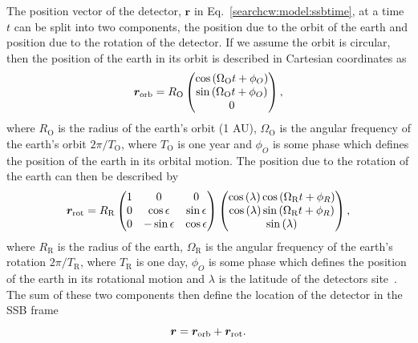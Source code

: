 The position vector of the detector,
$\bm{r}$ in Eq.~\ref{searchcw:model:ssbtime}, at a time $t$ can be split into two components,
the position due to the orbit of the earth and position due to the rotation of
the detector.
If we assume the orbit is circular, then the position of the earth in its orbit
is described in Cartesian coordinates as
%
\begin{equation}
    \bm{r}_{\rm{orb}} = R_{\mathrm{O}}
    \left(
    \begin{matrix}
        \cos{\left( \Omega_{\mathrm{O}} t + \phi_{O}  \right)}  \\
        \sin{\left( \Omega_{\mathrm{O}} t + \phi_{O}  \right)} \\
        0 \\
    \end{matrix} \right),
\end{equation}
%
where $R_{\mathrm{O}}$ is the radius of the earth's orbit (1 AU),
$\Omega_{\mathrm{O}}$ is the angular frequency of the earth's orbit
$2\pi/T_{\mathrm{O}}$, where $T_{\mathrm{O}}$ is one year and $\phi_{O}$ is
some phase which defines the position of the earth in its orbital motion.  The
position due to the rotation of the earth can then be described by 
%
\begin{equation}
    \bm{r}_{\rm{rot}} = R_{\mathrm{R}}
    \left(
    \begin{matrix}
        1 & 0 & 0  \\
        0 & \cos \epsilon & \sin \epsilon \\
        0 & -\sin \epsilon & \cos \epsilon \\
    \end{matrix} \right)
    \left(
    \begin{matrix}
        \cos{(\lambda)}\cos{\left( \Omega_{\mathrm{R}} t + \phi_{R}  \right)}  \\
        \cos{(\lambda)}\sin{\left( \Omega_{\mathrm{R}} t + \phi_{R}  \right)} \\
        \sin{(\lambda)} \\
    \end{matrix} \right),
\end{equation}
%
where $R_{\mathrm{R}}$ is the radius of the earth, $\Omega_{\mathrm{R}}$ is the
angular frequency of the earth's rotation $2\pi/T_{\mathrm{R}}$, where
$T_{\mathrm{R}}$ is one day, $\phi_{O}$ is some phase which defines the
position of the earth in its rotational motion and $\lambda$ is the latitude of
the detectors site~. The sum of these two components
then define the location of the detector in the \gls{SSB} frame
%
\begin{equation}
    \bm{r} = \bm{r}_{\rm{orb}} + \bm{r}_{\rm{rot}}.
\end{equation}

